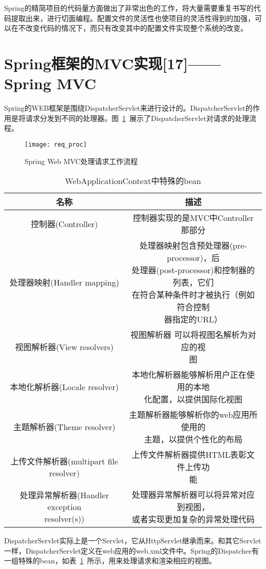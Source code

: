 Spring的精简项目的代码量方面做出了非常出色的工作，将大量需要重复书写的代码提取出来，进行切面编程。配置文件的灵活性也使项目的灵活性得到的加强，可以在不改变代码的情况下，而只有改变其中的配置文件实现整个系统的改变。

\section{Spring框架的MVC实现[17]——Spring MVC}
Spring的WEB框架是围绕DispatcherServlet来进行设计的。DispatcherServlet的作用是将请求分发到不同的处理器。图~\ref{fig:req_proc}~展示了DispatcherServlet对请求的处理流程。
\begin{figure}[htbp]
\centering
\texttt{[image: req\_proc]}
\caption{Spring Web MVC处理请求工作流程}\label{fig:req_proc}
\vspace{\baselineskip}
\end{figure}
\begin{table}[htbp]
\caption{WebApplicationContext中特殊的bean}\label{tab:bean}
\vspace{0.5em}\centering\wuhao
\begin{tabular}{|c|c|}
\toprule[1.5pt]
名称 & 描述\\
\midrule[1pt]
控制器(Controller) & 控制器实现的是MVC中Controller那部分\\\hline
处理器映射(Handler mapping) & \tabincell{c}{处理器映射包含预处理器(pre-processor)，后\\处理器(post-processor)和控制器的列表，它们\\在符合某种条件时才被执行（例如符合控制 \\器指定的URL）}\\\hline
视图解析器(View resolvers) & \tabincell{c}{视图解析器 可以将视图名解析为对应的视\\图}\\\hline
本地化解析器(Locale resolver) & \tabincell{c}{本地化解析器能够解析用户正在使用的本地\\化配置，以提供国际化视图}\\\hline
主题解析器(Theme resolver) & \tabincell{c}{主题解析器能够解析你的web应用所使用的\\主题，以提供个性化的布局}\\\hline
上传文件解析器(multipart file resolver) & \tabincell{c}{上传文件解析器提供HTML表彰文件上传功\\能}\\\hline
\tabincell{c}{处理异常解析器(Handler exception \\ resolver(s))} & \tabincell{c}{处理器异常解析器可以将异常对应到视图，\\或者实现更加复杂的异常处理代码}\\
\bottomrule[1.5pt]
\end{tabular}
\vspace{\baselineskip}
\end{table}
DispatcherServlet实际上是一个Servlet，它从HttpServlet继承而来。和其它Servlet一样，DispatcherServlet定义在web应用的web.xml文件中。Spring的Dispatcher有一组特殊的bean，如表~\ref{tab:bean}~所示，用来处理请求和渲染相应的视图。

